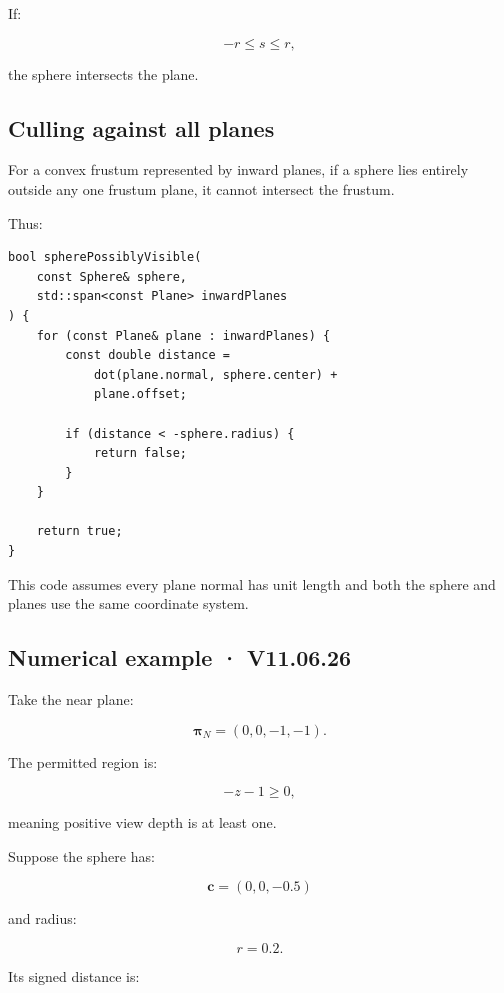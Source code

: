 If:

\[
 \boxed{-r\le s\le r},
\]

the sphere intersects the plane.

\subsection{Culling against all planes}\label{02-foundations-ii-ch034-culling-against-all-planes}

\hypertarget{02-foundations-ii-ch034-culling-against-all-planes}{}

For a convex frustum represented by inward planes, if a sphere lies entirely outside any one frustum plane, it cannot intersect the frustum.

Thus:

\begin{verbatim}
bool spherePossiblyVisible(
    const Sphere& sphere,
    std::span<const Plane> inwardPlanes
) {
    for (const Plane& plane : inwardPlanes) {
        const double distance =
            dot(plane.normal, sphere.center) +
            plane.offset;

        if (distance < -sphere.radius) {
            return false;
        }
    }

    return true;
}
\end{verbatim}

This code assumes every plane normal has unit length and both the sphere and planes use the same coordinate system.

\subsection{Numerical example · V11.06.26}\label{02-foundations-ii-ch034-numerical-example-v11.06.26}

\hypertarget{02-foundations-ii-ch034-numerical-example-v11.06.26}{}

Take the near plane:

\[
 \boldsymbol\pi_N=(0,0,-1,-1).
\]

The permitted region is:

\[
 -z-1\ge0,
\]

meaning positive view depth is at least one.

Suppose the sphere has:

\[
 \mathbf c=(0,0,-0.5)
\]

and radius:

\[
 r=0.2.
\]

Its signed distance is:

